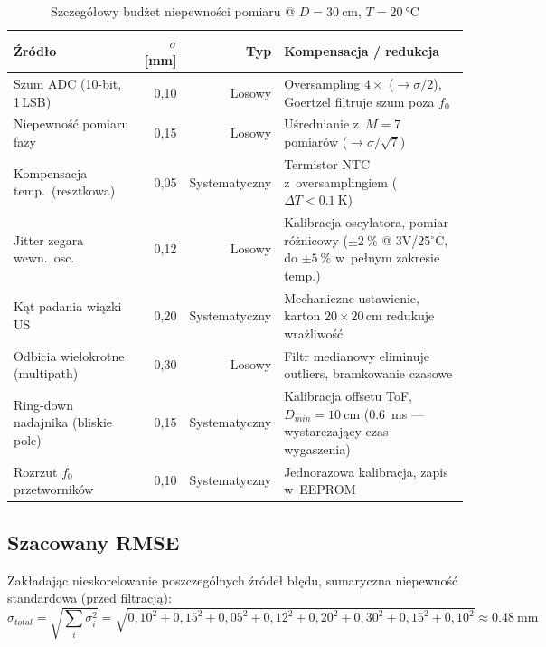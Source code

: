 \documentclass[a4paper,11pt]{article}
\begin{document}
	\begin{table}[H]
		\centering
		\caption{Szczegółowy budżet niepewności pomiaru @ $D = \SI{30}{\centi\metre}$, $T = \SI{20}{\celsius}$}
		\label{tab:bledy}
		\begin{tabularx}{\textwidth}{>{\raggedright\arraybackslash}p{3.8cm}rrX}
			\toprule
			\textbf{Źródło} & \textbf{$\sigma$ [\si{\milli\metre}]} & \textbf{Typ}
			& \textbf{Kompensacja / redukcja} \\
			\midrule
			Szum ADC (10-bit, 1\,LSB)
			& 0,10
			& Losowy
			& Oversampling $4\times$ ($\to \sigma/2$), Goertzel filtruje szum poza $f_0$ \\
			Niepewność pomiaru fazy
			& 0,15
			& Losowy
			& Uśrednianie z~$M=7$ pomiarów ($\to \sigma/\sqrt{7}$) \\
			Kompensacja temp.\ (resztkowa)
			& 0,05
			& Systematyczny
			& Termistor NTC z~oversamplingiem ($\Delta T < \SI{0,1}{\kelvin}$) \\
			Jitter zegara wewn.\ osc.
			& 0,12
			& Losowy
			& Kalibracja oscylatora, pomiar różnicowy ($\pm\SI{2}{\percent}$ @ 3V/25$^\circ$C, do $\pm\SI{5}{\percent}$ w~pełnym zakresie temp.) \\
			Kąt padania wiązki US
			& 0,20
			& Systematyczny
			& Mechaniczne ustawienie, karton $20\times20$\,cm redukuje wrażliwość \\
			Odbicia wielokrotne (multipath)
			& 0,30
			& Losowy
			& Filtr medianowy eliminuje outliers, bramkowanie czasowe \\
			Ring-down nadajnika (bliskie pole)
			& 0,15
			& Systematyczny
			& Kalibracja offsetu ToF, $D_{min} = \SI{10}{\centi\metre}$ (\SI{0,6}{\milli\second} --- wystarczający czas wygaszenia) \\
			Rozrzut $f_0$ przetworników
			& 0,10
			& Systematyczny
			& Jednorazowa kalibracja, zapis w~EEPROM \\
			\bottomrule
		\end{tabularx}
	\end{table}
	
	\subsection{Szacowany RMSE}
	
	Zakładając nieskorelowanie poszczególnych źródeł błędu, sumaryczna
	niepewność standardowa (przed filtracją):
	\begin{equation}
		\sigma_{total} = \sqrt{\sum_i \sigma_i^2}
		= \sqrt{0{,}10^2 + 0{,}15^2 + 0{,}05^2 + 0{,}12^2 + 0{,}20^2 + 0{,}30^2 + 0{,}15^2 + 0{,}10^2}
		\approx \SI{0,48}{\milli\metre}
		\label{eq:sigma_total}
	\end{equation}
	
\end{document}
